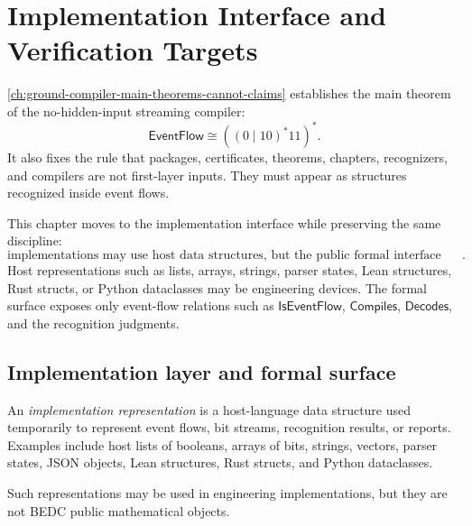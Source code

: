 \chapter{Implementation Interface and Verification Targets}
\label{ch:ground-compiler-implementation-interface}

\autoref{ch:ground-compiler-main-theorems-cannot-claims} establishes the main theorem of the no-hidden-input streaming compiler:
$$
  \mathsf{EventFlow}\cong((0\mid 10)^{\ast}11)^{\ast}.
$$
It also fixes the rule that packages, certificates, theorems, chapters, recognizers, and compilers are not first-layer inputs. They must appear as structures recognized inside event flows.

This chapter moves to the implementation interface while preserving the same discipline:
$$
  \boxed{\text{implementations may use host data structures, but the public formal interface may not expose them as BEDC primitives}.}
$$
Host representations such as lists, arrays, strings, parser states, Lean structures, Rust structs, or Python dataclasses may be engineering devices. The formal surface exposes only event-flow relations such as $\mathsf{IsEventFlow}$, $\mathsf{Compiles}$, $\mathsf{Decodes}$, and the recognition judgments.

\section{Implementation layer and formal surface}
\label{sec:implementation-interface-formal-surface}

\begin{definition}
\label{def:implementation-interface-representation}
An \emph{implementation representation} is a host-language data structure used temporarily to represent event flows, bit streams, recognition results, or reports. Examples include host lists of booleans, arrays of bits, strings, vectors, parser states, JSON objects, Lean structures, Rust structs, and Python dataclasses.

Such representations may be used in engineering implementations, but they are not BEDC public mathematical objects.
\end{definition}

